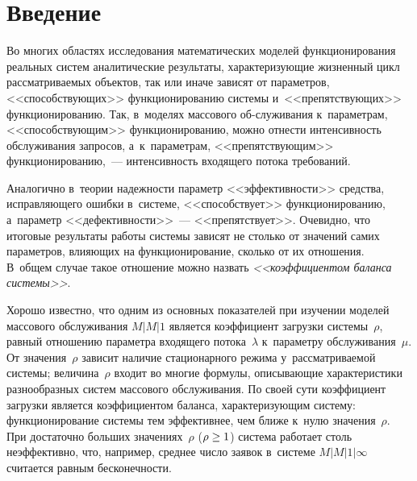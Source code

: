 \vspace*{-4pt}


\thispagestyle{headings}

\begin{multicols}{2}

\label{st\stat}

\section{Введение}

\vspace*{-2pt}

Во многих областях исследования математических моделей функционирования 
реальных систем аналитические результаты, характеризующие жизненный цикл 
рассматриваемых объектов, так или иначе зависят от параметров, <<способ\-ст\-ву\-ющих>> 
функционированию системы и~<<препятствующих>> функционированию. Так, в~моделях 
массового об-\linebreak служивания к~параметрам, <<способствующим>> функционированию, можно 
отнести интенсивность обслуживания запросов, а~к~па\-ра\-мет\-рам, <<препятствующим>> 
функционированию,~--- интенсивность входящего потока требований. 

Аналогично 
в~теории надежности па\-ра\-метр <<эффективности>> средства, исправляющего ошибки 
в~системе, <<способствует>> функционированию, а~па\-ра\-метр <<дефективности>>~--- 
<<препятствует>>. Очевидно, что итоговые результаты работы системы зависят не 
столько от значений самих па\-ра\-мет\-ров, влияющих на функционирование, сколько от 
их отношения. В~общем случае такое отношение можно назвать 
{\it <<коэффициентом баланса системы>>}.

Хорошо известно, что одним из основных показателей при изучении моделей 
массового обслуживания $M|M|1$ является коэффициент загрузки системы~$\rho$, 
равный отношению параметра входящего потока~$\lambda$ к~параметру обслуживания~$\mu$. 
От значения~$\rho$ зависит наличие стационарного режима у~рассматриваемой системы; 
величина~$\rho$ входит во многие формулы, описывающие характеристики разнообразных 
систем массового обслуживания. По своей сути коэффициент загрузки является коэффициентом 
баланса, характеризующим систему: функционирование системы тем эффективнее, чем ближе 
к~нулю значения~$\rho$. При достаточно больших значениях~$\rho$ ($\rho\hm\ge1$) 
система работает столь неэффективно, что, например, среднее число заявок 
в~системе $M|M|1|\infty$ считается равным бесконеч\-ности.


\end{multicols}
